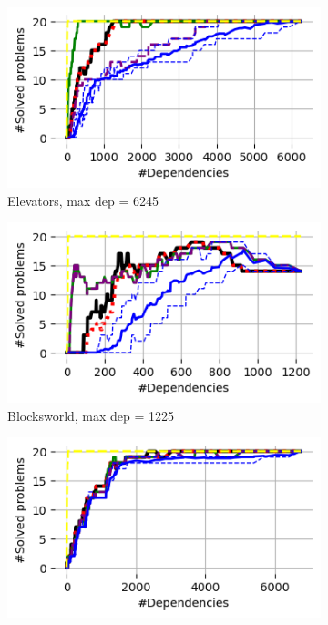 \documentclass{article}
\theoremstyle{remark}
\begin{document}
\begin{figure}[t!]
\centering
\begin{subfigure}[b]{0.25\textwidth}
\centering
  \includegraphics[width=1\linewidth]{Results_graphs/Joint_Projection/With_Random/coverage_Joint_Projection_Elevators}
  \caption{Elevators, max dep = 6245}
  \label{fig:Elevators}
\end{subfigure}\hspace{1em}
\begin{subfigure}[b]{0.25\textwidth}
\centering
  \includegraphics[width=1\linewidth]{Results_graphs/Joint_Projection/With_Random/coverage_Joint_Projection_BlocksWorld}
  \caption{Blocksworld, max dep = 1225}
  \label{fig:Blocksworld}
\end{subfigure}\hspace{1em}
\begin{subfigure}[b]{0.25\textwidth}
\centering
  \includegraphics[width=1\linewidth]{Results_graphs/Joint_Projection/With_Random/coverage_Joint_Projection_Depot_not_trun}

\end{subfigure}
\end{figure}
\end{document}
